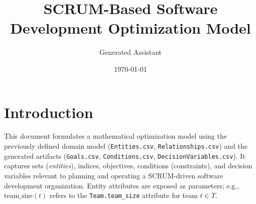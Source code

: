 \documentclass[11pt,a4paper]{article}
\title{SCRUM-Based Software Development Optimization Model}
\author{Generated Assistant}
\date{\today}
\begin{document}
\maketitle
\tableofcontents
\newpage

\section*{Introduction}
This document formulates a mathematical optimization model using the previously defined domain model (\texttt{Entities.csv}, \texttt{Relationships.csv}) and the generated artifacts (\texttt{Goals.csv}, \texttt{Conditions.csv}, \texttt{DecisionVariables.csv}). It captures sets (\emph{entities}), indices, objectives, conditions (constraints), and decision variables relevant to planning and operating a SCRUM-driven software development organization. Entity attributes are exposed as parameters; e.g., \(\text{team\_size}(t)\) refers to the \texttt{Team.team\_size} attribute for team \(t \in T\).
\end{document}
